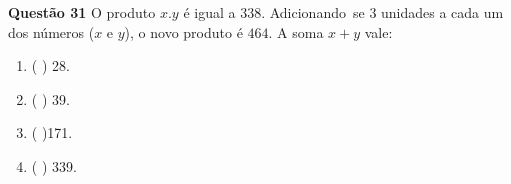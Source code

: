 {\bf Questão 31} O produto $x.y$ é igual a $338$. Adicionando~se $3$ 
unidades a cada um dos números ($x$ e $y$), o novo produto é $464$.
A soma $x+y$ vale:
\begin{multicols}{4}
\begin{enumerate}
		\item ( ) 28.
		\item ( ) 39.
		\item ( )171.
		\item ( ) 339.
\end{enumerate}
\end{multicols}
